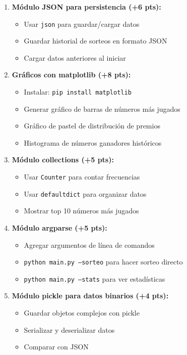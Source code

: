 \documentclass[12pt,a4paper]{article}
\begin{document}
\begin{enumerate}[leftmargin=*]
    \item \textbf{Módulo JSON para persistencia (+6 pts):}
    \begin{itemize}
        \item Usar \texttt{json} para guardar/cargar datos
        \item Guardar historial de sorteos en formato JSON
        \item Cargar datos anteriores al iniciar
    \end{itemize}
    
    \item \textbf{Gráficos con matplotlib (+8 pts):}
    \begin{itemize}
        \item Instalar: \texttt{pip install matplotlib}
        \item Generar gráfico de barras de números más jugados
        \item Gráfico de pastel de distribución de premios
        \item Histograma de números ganadores históricos
    \end{itemize}
    
    \item \textbf{Módulo collections (+5 pts):}
    \begin{itemize}
        \item Usar \texttt{Counter} para contar frecuencias
        \item Usar \texttt{defaultdict} para organizar datos
        \item Mostrar top 10 números más jugados
    \end{itemize}
    
    \item \textbf{Módulo argparse (+5 pts):}
    \begin{itemize}
        \item Agregar argumentos de línea de comandos
        \item \texttt{python main.py --sorteo} para hacer sorteo directo
        \item \texttt{python main.py --stats} para ver estadísticas
    \end{itemize}
    
    \item \textbf{Módulo pickle para datos binarios (+4 pts):}
    \begin{itemize}
        \item Guardar objetos complejos con pickle
        \item Serializar y deserializar datos
        \item Comparar con JSON
    \end{itemize}
    

\end{enumerate}
\end{document}
